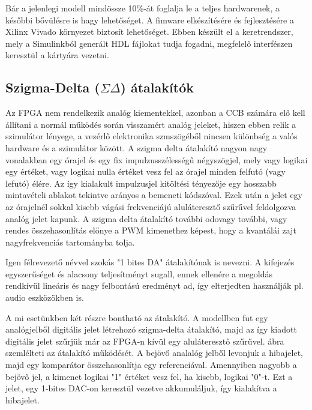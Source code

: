 Bár a jelenlegi modell mindössze 10\%-át foglalja le a teljes hardwarenek, a későbbi bővülésre is hagy lehetőséget. A fimware elkészítésére és fejlesztésére a Xilinx Vivado környezet biztosít lehetőséget. Ebben készült el a keretrendszer, mely a Simulinkból generált HDL fájlokat tudja fogadni, megfelelő interfészen keresztül a kártyára vezetni.


\subsection{Szigma-Delta ($\Sigma{}\Delta{}$) átalakítók}

Az FPGA nem rendelkezik analóg kiementekkel, azonban a CCB számára elő kell állítani a normál működés során visszamért analóg jeleket, hiszen ebben relik a szimulátor lényege, a vezérlő elektronika szmszögéből nincsen különbség a valós hardware és a szimulátor között. A szigma delta átalakító nagyon nagy vonalakban egy órajel és egy fix impulzusszélességű négyszögjel, mely vagy logikai egy értéket, vagy logikai nulla értéket vesz fel az órajel minden felfutó (vagy lefutó) élére. Az így kialakult impulzusjel kitöltési tényezője egy hosszabb mintavételi ablakot tekintve arányos a bemeneti kódszóval. Ezek után a jelet egy az órajelnél sokkal kisebb vágási frekvenciájú aluláteresztő szűrűvel feldolgozva analóg jelet kapunk. A szigma delta átalakító további odo{vagy további, vagy rendes összehasonlítás} előnye a PWM kimenethez képest, hogy a kvantálái zajt nagyfrekvenciás tartományba tolja.\cite{artofelectronics}


Igen félrevezető névvel szokás "1 bites DA" átalakítónak is nevezni. A kifejezés egyszerűséget és alacsony teljesítményt sugall, ennek ellenére a megoldás rendkívül lineáris és nagy felbontású eredményt ad, így elterjedten használják pl. audio eszközökben is.

A mi esetünkben két részre bontható az átalakító. A modellben fut egy analógjelből digitális jelet létrehozó szigma-delta átalakító, majd az így kiadott digitális jelet szűrjük már az FPGA-n kívül egy aluláteresztő szűrűvel.  ábra szemlélteti az átalakító működését. A bejövő analalóg jelből levonjuk a hibajelet, majd egy komparátor összehasonlítja egy referenciával. Amennyiben nagyobb a bejövő jel, a kimenet logikai "1" értéket vesz fel, ha kisebb, logikai "0"-t. Ezt a jelet, egy 1-bites DAC-on keresztül vezetve akkumuláljuk, így kialakítva a hibajelet. 

